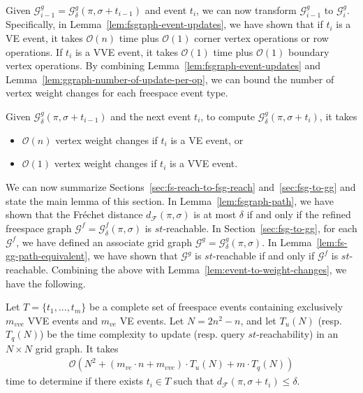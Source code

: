 \documentclass[thm-restate]{lipics-v2021}
\theoremstyle{remark}
\newcommand{\Oh}{\mathcal{O}}
\newcommand{\graph}[0]{\mathcal{G}}
\newcommand{\df}[1]{d_{\mathcal{F}}(#1)}
\newcommand{\fsgraph}[0]{\graph^{f}}
\newcommand{\ggraph}[0]{\graph^g}
\begin{document}
Given $\ggraph_{i - 1} = \ggraph_\delta(\pi, \sigma + t_{i - 1})$ and event $t_{i}$, we can now transform $\ggraph_{i - 1}$ to $\ggraph_{i}$. Specifically, in Lemma~\ref{lem:fsgraph-event-updates}, we have shown that if $t_{i}$ is a VE event, it takes $\Oh(n)$ time plus $\Oh(1)$ corner vertex operations or row operations. If $t_i$ is a VVE event, it takes $\Oh(1)$ time plus $\Oh(1)$ boundary vertex operations. By combining Lemma~\ref{lem:fsgraph-event-updates} and Lemma~\ref{lem:ggraph-number-of-update-per-op}, we can bound the number of vertex weight changes for each freespace event type. 
\begin{lemma} \label{lem:event-to-weight-changes}
    Given $\ggraph_\delta(\pi, \sigma + t_{i - 1})$ and the next event $t_i$, to compute $\ggraph_\delta(\pi, \sigma + t_{i})$, it takes 
    \begin{itemize}
        \item $\Oh(n)$ vertex weight changes if $t_i$ is a VE event, or
        \item $\Oh(1)$ vertex weight changes if $t_i$ is a VVE event. 
    \end{itemize}
\end{lemma}

We can now summarize Sections~\ref{sec:fs-reach-to-fsg-reach} and~\ref{sec:fsg-to-gg} and state the main lemma of this section. In Lemma~\ref{lem:fsgraph-path}, we have shown that the Fréchet distance $\df{\pi, \sigma}$ is at most $\delta$ if and only if the refined freespace graph $\fsgraph = \fsgraph_\delta(\pi, \sigma)$ is $st$-reachable. In Section~\ref{sec:fsg-to-gg}, for each $\fsgraph$, we have defined an associate grid graph $\ggraph = \ggraph_\delta(\pi, \sigma)$. In Lemma~\ref{lem:fs-gg-path-equivalent}, we have shown that $\ggraph$ is $st$-reachable if and only if $\fsgraph$ is $st$-reachable. Combining the above with Lemma~\ref{lem:event-to-weight-changes}, we have the following.

\begin{lemma} \label{lem:ggraph-summarized}
    Let $T = \{t_1, ..., t_m\}$ be a complete set of freespace events containing exclusively $m_{vve}$ VVE events and $m_{ve}$ VE events. Let $N = 2n^2 - n$, and let $T_u(N)$ (resp. $T_q(N)$) be the time complexity to update (resp. query $st$-reachability) in an $N \times N$ grid graph. It takes
    \begin{align*}
        \Oh(N^2 + (m_{ve} \cdot n + m_{vve}) \cdot T_u(N) + m \cdot T_q(N))
    \end{align*}
    time to determine if there exists $t_i \in T$ such that $\df{\pi, \sigma + t_i} \leq \delta$. 
\end{lemma}
\end{document}
